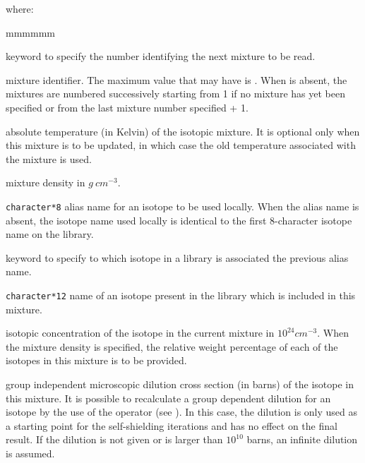 \noindent
where:

\begin{ListeDeDescription}{mmmmmm}

\item[\moc{MIX}] keyword to specify the number identifying the next mixture to
be read.

\item[\dusa{matnum}] mixture identifier. The maximum value that 
may have is . When  is absent, the mixtures are
numbered successively starting from 1 if no mixture has yet been specified or
from the last mixture number specified + 1.

\item[\dusa{temp}] absolute temperature (in Kelvin) of the isotopic mixture.
It is optional only when this mixture is to be updated, in which case the old
temperature associated with the mixture is used.

\item[\dusa{denmix}] mixture density in $g \ cm^{-3}$. 

\item[\dusa{NAMALI}] {\tt character*8} alias name for an isotope to be used
locally. When the alias name is absent, the isotope name used locally is
identical to the first 8-character isotope name on the library.

\item[\moc{=}] keyword to specify to which isotope in a library is associated
the previous alias name.

\item[\dusa{NAMISO}] {\tt character*12} name of an isotope present in the
library which is included in this mixture.

\item[\dusa{dens}]  isotopic concentration of the isotope  in the
current mixture in $10^{24}cm^{-3}$.  When the mixture density  
is specified, the relative weight percentage of each of the isotopes in this
mixture is to be provided.

\item[\dusa{dil}] group independent microscopic dilution cross section (in
barns) of the isotope  in this mixture. It is possible to
recalculate a group dependent dilution for an isotope by the use of the
 operator (see ). In this case, the dilution is only used
as a starting point for the self-shielding iterations and has no effect on the
final result. If the dilution is not given or is larger than $10^{10}$ barns,
an infinite dilution is assumed.


\end{ListeDeDescription}

